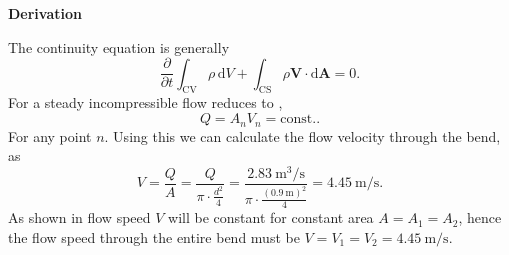 \documentclass[a4paper]{article}
\renewcommand{\Vec}[1]{\boldsymbol{#1}}
\numberwithin{equation}{problem}
\newcommand{\AUheading}[1]{%
  \par\vspace{.4\baselineskip}%
  {\sffamily\bfseries\color{AUblueDark}#1\par}%
  \nobreak%
}
\newenvironment{derivation}[1][Derivation]{%
  \AUheading{#1}
  \begingroup\allowdisplaybreaks
  \setlength{\abovedisplayskip}{6pt}%
  \setlength{\belowdisplayskip}{6pt}%
  \setlength{\abovedisplayshortskip}{4pt}%
  \setlength{\belowdisplayshortskip}{4pt}%
}{\par\endgroup\medskip}
\begin{document}
\begin{derivation}
The continuity equation is generally
\begin{equation}\label{eq:contgen}
  \frac{\partial}{\partial t} \int_{\mathrm{CV}} \rho \, \mathrm{d}V + \int_{\mathrm{CS}} \rho \Vec{V} \cdot \mathrm{d} \Vec{A} = 0
.\end{equation}
For a steady incompressible flow  reduces to ,
\[ 
Q = A_n V_n = \mathrm{const.}
.\]
For any point $n$.
Using this we can calculate the flow velocity through the bend, as
\[ 
V = \frac{Q}{A} = \frac{Q}{\pi\cdot \frac{d^2}{4}} = \frac{\qty{2,83}{\cubic\meter\per\second} }{\pi \cdot \frac{\left( \qty{0,9}{\meter}  \right)^2}{4}} = \qty{4,45}{\meter\per\second}
.\]
As shown in  flow speed $V$ will be constant for constant area $A = A_1 = A_2$, hence the flow speed through the entire bend must be $V = V_1 = V_2 = \qty{4,45}{\meter\per\second}$.


\end{derivation}
\end{document}
